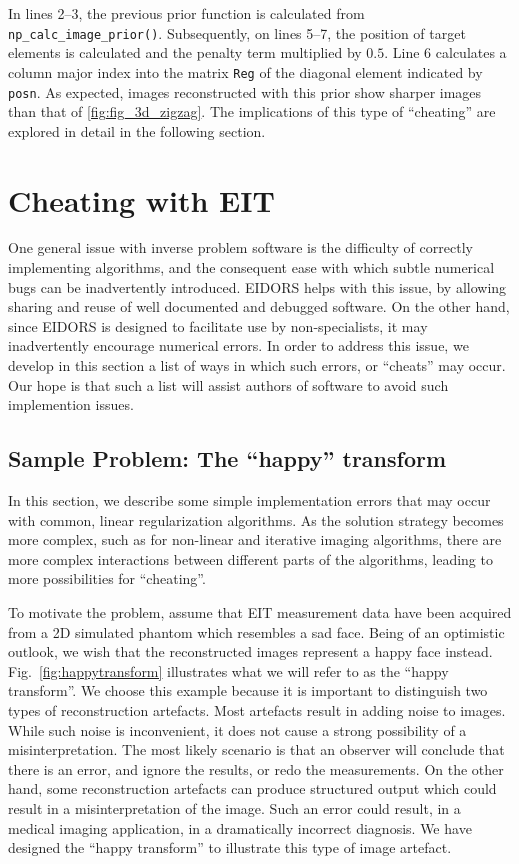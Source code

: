 \documentclass[12pt]{iopart}
\begin{document}
In lines 2--3, the previous prior function is calculated
from {\tt np\_calc\_image\_prior()}. Subsequently, on lines
5--7, the position of target elements is calculated and
the penalty term multiplied by $0.5$. Line 6 calculates
a column major index into the matrix {\tt Reg} of the
diagonal element indicated by {\tt posn}. As expected,
images reconstructed with this prior show sharper
images than that of \ref{fig:fig_3d_zigzag}.
The implications of this type of ``cheating'' are explored
in detail in the following section.



\section{
 Cheating with EIT
}

One general issue with inverse problem software is the difficulty
of correctly implementing algorithms, and the consequent ease with
which subtle numerical bugs can be inadvertently introduced.
EIDORS helps with this issue, by allowing sharing and reuse
of well documented and debugged software. On the other hand, 
since EIDORS is designed to facilitate use by non-specialists,
it may inadvertently encourage numerical errors.
In order to address this issue, we develop in this section
a list of ways in which such errors, or ``cheats'' may occur.
Our hope is that such a list will assist authors of software
to avoid such implemention issues.

\subsection{
Sample Problem: The ``happy'' transform
}

In this section, we describe some simple implementation
errors that may occur with common, linear
regularization algorithms. As the solution
strategy becomes more complex, such as for non-linear 
and iterative imaging algorithms, there are
more complex interactions between different 
parts of the algorithms, leading to more possibilities
for ``cheating''.

To motivate the problem, assume that EIT measurement
data have been acquired from a 2D simulated phantom which resembles
a sad face. Being of an optimistic outlook, we wish
that the reconstructed images represent a happy face
instead. Fig.~\ref{fig:happytransform}
illustrates what we will refer to as the ``happy transform''.
We choose this example because it is important to distinguish
two types of reconstruction artefacts. Most artefacts result
in adding noise to images. While such noise is inconvenient, it does
not cause a strong possibility of a misinterpretation.
The most likely scenario is that an observer will conclude
that there is an error, and ignore the results, or redo the measurements.
On the other hand, some reconstruction artefacts can
produce structured output which could result in a 
misinterpretation of the image. Such an error could result, in a
medical imaging application, in a dramatically
incorrect diagnosis. We have designed the ``happy transform''
to illustrate this type of image artefact.
\end{document}
